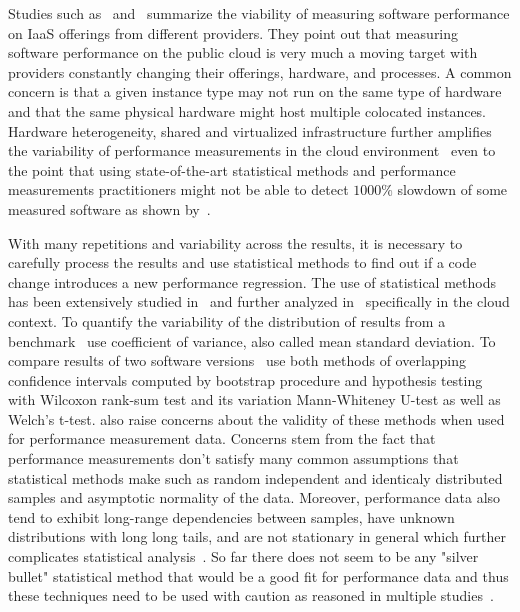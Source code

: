 Studies such as~\citet{leitner2016patterns} and~\citet{laaber2019software} summarize the viability of measuring software performance on IaaS offerings from different providers.
They point out that measuring software performance on the public cloud is very much a moving target with providers constantly changing their offerings, hardware, and processes.
A common concern is that a given instance type may not run on the same type of hardware and that the same physical hardware might host multiple colocated instances.
Hardware heterogeneity, shared and virtualized infrastructure further amplifies the variability of performance measurements in the cloud environment~\cite{leitner2016patterns} even to the point that using state-of-the-art statistical methods and performance measurements practitioners might not be able to detect $1000\%$ slowdown of some measured software as shown by~\citet{laaber2019software}.

With many repetitions and variability across the results, it is necessary to carefully process the results and use statistical methods to find out if a code change introduces a new performance regression.
The use of statistical methods has been extensively studied in~\citet{bulej2017stat} and further analyzed in~\citet{laaber2019software} specifically in the cloud context.
To quantify the variability of the distribution of results from a benchmark~\citet{laaber2019software} use coefficient of variance, also called mean standard deviation.
To compare results of two software versions~\citet{bulej2017stat} use both methods of overlapping confidence intervals computed by bootstrap procedure and hypothesis testing with Wilcoxon rank-sum test and its variation Mann-Whiteney U-test as well as Welch's t-test.
\citet{bulej2017stat} also raise concerns about the validity of these methods when used for performance measurement data.
Concerns stem from the fact that performance measurements don't satisfy many common assumptions that statistical methods make such as random independent and identicaly distributed samples and asymptotic normality of the data.
Moreover, performance data also tend to exhibit long-range dependencies between samples, have unknown distributions with long long tails, and are not stationary in general which further complicates statistical analysis~\cite{bulej2017stat}.
So far there does not seem to be any "silver bullet" statistical method that would be a good fit for performance data and thus these techniques need to be used with caution as reasoned in multiple studies~\cite{leitner2016patterns, laaber2019software, bulej2017stat}.

